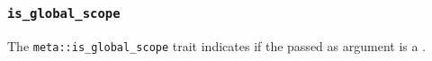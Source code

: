 
\subsubsection{\texttt{is\_global\_scope}}

The \texttt{meta::is\_global\_scope}
trait indicates if the  passed as argument is a .


